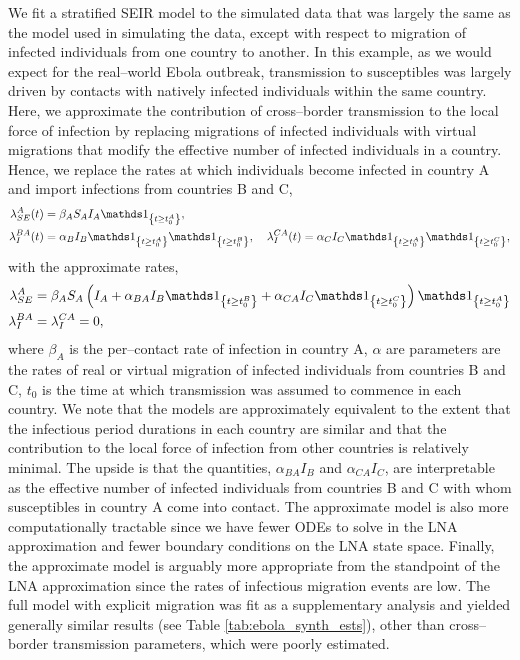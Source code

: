 We fit a stratified SEIR model to the simulated data that was largely the same as the model used in simulating the data, except with respect to migration of infected individuals from one country to another. In this example, as we would expect for the real--world Ebola outbreak, transmission to susceptibles was largely driven by contacts with natively infected individuals within the same country. Here, we approximate the contribution of cross--border transmission to the local force of infection by replacing migrations of infected individuals with virtual migrations that modify the effective number of infected individuals in a country. Hence, we replace the rates at which individuals become infected in country A and import infections from countries B and C,
\begin{align}
\label{eqn:foi_migration}
\lambda_{SE}^A(t) &= \beta_A S_A I_A\ind{t\geq t_{0}^A}, \\
\lambda_I^{BA}(t) &= \alpha_BI_B\ind{t\geq t_{0}^A}\ind{t\geq t_{0}^B},\ \hspace{0.1in} \lambda_I^{CA}(t) = \alpha_CI_C\ind{t\geq t_{0}^A}\ind{t\geq t_{0}^C},
\end{align}
with the approximate rates,
\begin{align}
\label{eqn:foi_virtual}
\lambda_{SE}^A &= \beta_AS_A\left (I_A + \alpha_{BA}I_B\ind{t\geq t_{0}^B} + \alpha_{CA}I_C\ind{t\geq t_{0}^C}\right )\ind{t\geq t_{0}^A}\\
\lambda_I^{BA} &= \lambda_I^{CA} = 0,
\end{align}
where $ \beta_A $ is the per--contact rate of infection in country A, $ \alpha $ are parameters are the rates of real or virtual migration of infected individuals from countries B and C, $ t_0 $ is the time at which transmission was assumed to commence in each country. We note that the models are approximately equivalent to the extent that the infectious period durations in each country are similar and that the contribution to the local force of infection from other countries is relatively minimal. The upside is that the quantities, $ \alpha_{BA}I_B $ and $ \alpha_{CA}I_C$, are interpretable as the effective number of infected individuals from countries B and C with whom susceptibles in country A come into contact. The approximate model is also more computationally tractable since we have fewer ODEs to solve in the LNA approximation and fewer boundary conditions on the LNA state space. Finally, the approximate model is arguably more appropriate from the standpoint of the LNA approximation since the rates of infectious migration events are low. The full model with explicit migration was fit as a supplementary analysis and yielded generally similar results (see Table \ref{tab:ebola_synth_ests}), other than cross--border transmission parameters, which were poorly estimated.  

